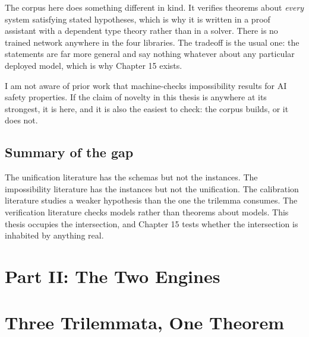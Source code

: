 \documentclass{memoir}
\begin{document}
The corpus here does something different in kind. It verifies theorems about
\emph{every} system satisfying stated hypotheses, which is why it is written in a
proof assistant with a dependent type theory rather than in a solver. There is
no trained network anywhere in the four libraries. The tradeoff is the usual
one: the statements are far more general and say nothing whatever about any
particular deployed model, which is why Chapter 15 exists.

I am not aware of prior work that machine-checks impossibility results for AI
safety properties. If the claim of novelty in this thesis is anywhere at its
strongest, it is here, and it is also the easiest to check: the corpus builds,
or it does not.



\section{Summary of the gap}\label{Two--Schemas--of--Impossibility-005F-005F-005F--Machine--Checked--Limits--of--Trustworthy--Machine--Learning-005F-005F-005F--and--Why--They--Tighten--with--Capability----Related--Work--and--Positioning----Summary--of--the--gap}

The unification literature has the schemas but not the instances. The
impossibility literature has the instances but not the unification. The
calibration literature studies a weaker hypothesis than the one the trilemma
consumes. The verification literature checks models rather than theorems about
models. This thesis occupies the intersection, and Chapter 15 tests whether the
intersection is inhabited by anything real.





\chapter{Part II: The Two Engines}\label{Two--Schemas--of--Impossibility-005F-005F-005F--Machine--Checked--Limits--of--Trustworthy--Machine--Learning-005F-005F-005F--and--Why--They--Tighten--with--Capability----Part--II-005F-005F-005F--The--Two--Engines}




\chapter{Three Trilemmata, One Theorem}\label{Two--Schemas--of--Impossibility-005F-005F-005F--Machine--Checked--Limits--of--Trustworthy--Machine--Learning-005F-005F-005F--and--Why--They--Tighten--with--Capability----Three--Trilemmata-005F-005F-005F--One--Theorem}
\end{document}
